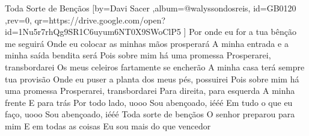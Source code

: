 \beginsong
{Toda Sorte de Bençãos %
}[by={Davi Sacer %
},album={@walyssondosreis},
id={GB0120 %
},rev={0}, %
qr={https://drive.google.com/open?id=1Nu5r7rhQg9SR1C6uyum6NT0X9SWoClP5 %
}]
\beginverse*
Por onde eu for a tua bênção me seguirá
Onde eu colocar as minhas mãos prosperará
A minha entrada e a minha saída bendita será
Pois sobre mim há uma promessa
Prosperarei, transbordarei
\endverse
\beginverse*
Os meus celeiros fartamente se encherão
A minha casa terá sempre tua provisão
Onde eu puser a planta dos meus pés, possuirei
Pois sobre mim há uma promessa
Prosperarei, transbordarei
\endverse
\beginchorus
Para direita, para esquerda
A minha frente
E para trás
Por todo lado, uooo
Sou abençoado, iééé
Em tudo o que eu faço, uooo
Sou abençoado, iééé
\endchorus
\beginverse*
Toda sorte de bençãos
O senhor preparou para mim
E em todas as coisas
Eu sou mais do que vencedor
\endverse

